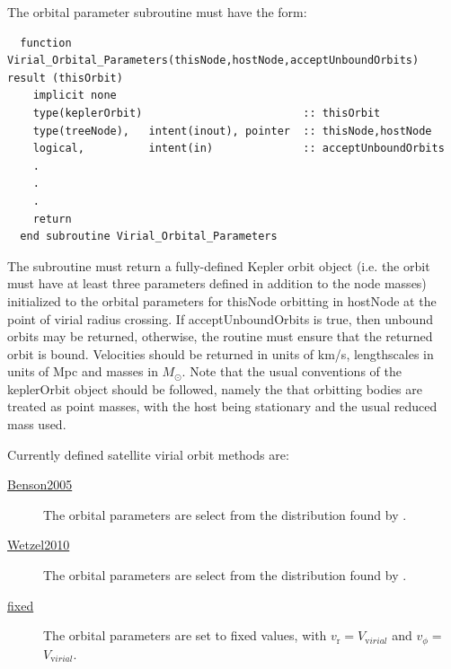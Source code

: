 The orbital parameter subroutine must have the form:
\begin{verbatim}
  function Virial_Orbital_Parameters(thisNode,hostNode,acceptUnboundOrbits) result (thisOrbit)
    implicit none
    type(keplerOrbit)                         :: thisOrbit
    type(treeNode),   intent(inout), pointer  :: thisNode,hostNode
    logical,          intent(in)              :: acceptUnboundOrbits
    .
    .
    .
    return
  end subroutine Virial_Orbital_Parameters
\end{verbatim}
The subroutine must return a fully-defined Kepler orbit object (i.e. the orbit must have at least three parameters defined in addition to the node masses) initialized to the orbital parameters for {\normalfont \ttfamily thisNode} orbitting in {\normalfont \ttfamily hostNode} at the point of virial radius crossing. If {\normalfont \ttfamily acceptUnboundOrbits} is true, then unbound orbits may be returned, otherwise, the routine must ensure that the returned orbit is bound. Velocities should be returned in units of km/s, lengthscales in units of Mpc and masses in $M_\odot$. Note that the usual conventions of the {\normalfont \ttfamily keplerOrbit} object should be followed, namely the that orbitting bodies are treated as point masses, with the host being stationary and the usual reduced mass used.

Currently defined satellite virial orbit methods are:
\begin{description}
 \item [\hyperlink{satellites.merging.virial_orbits.Benson2005.F90:virial_orbits_benson2005:virial_orbital_parameters_benson2005}{{\normalfont \ttfamily Benson2005}}] The orbital parameters are select from the distribution found by \cite{benson_orbital_2005}.
 \item [\hyperlink{satellites.merging.virial_orbits.Wetzel2010.F90:virial_orbits_wetzel2010:virial_orbital_parameters_wetzel2010}{{\normalfont \ttfamily Wetzel2010}}] The orbital parameters are select from the distribution found by \cite{wetzel_orbits_2010}.
 \item [\hyperlink{satellites.merging.virial_orbits.fixed.F90:virial_orbits_fixed:virial_orbital_parameters_fixed}{{\normalfont \ttfamily fixed}}] The orbital parameters are set to fixed values, with $v_{\mathrm r}=${\normalfont \ttfamily [virialOrbitsFixedRadialVelocity]}$V_{\mathrm virial}$ and  $v_\phi=${\normalfont \ttfamily [virialOrbitsFixedTangentialVelocity]}$V_{\mathrm virial}$.
\end{description}

